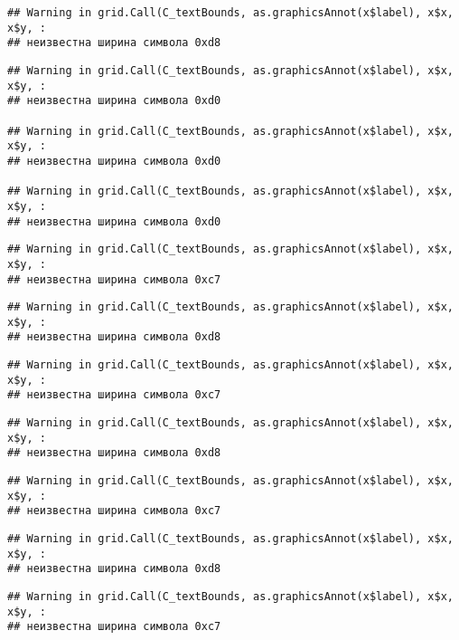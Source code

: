 \documentclass[
]{article}
\begin{document}
\begin{verbatim}
## Warning in grid.Call(C_textBounds, as.graphicsAnnot(x$label), x$x, x$y, :
## неизвестна ширина символа 0xd8
\end{verbatim}

\begin{verbatim}
## Warning in grid.Call(C_textBounds, as.graphicsAnnot(x$label), x$x, x$y, :
## неизвестна ширина символа 0xd0

## Warning in grid.Call(C_textBounds, as.graphicsAnnot(x$label), x$x, x$y, :
## неизвестна ширина символа 0xd0

## Warning in grid.Call(C_textBounds, as.graphicsAnnot(x$label), x$x, x$y, :
## неизвестна ширина символа 0xd0
\end{verbatim}

\begin{verbatim}
## Warning in grid.Call(C_textBounds, as.graphicsAnnot(x$label), x$x, x$y, :
## неизвестна ширина символа 0xc7
\end{verbatim}

\begin{verbatim}
## Warning in grid.Call(C_textBounds, as.graphicsAnnot(x$label), x$x, x$y, :
## неизвестна ширина символа 0xd8
\end{verbatim}

\begin{verbatim}
## Warning in grid.Call(C_textBounds, as.graphicsAnnot(x$label), x$x, x$y, :
## неизвестна ширина символа 0xc7
\end{verbatim}

\begin{verbatim}
## Warning in grid.Call(C_textBounds, as.graphicsAnnot(x$label), x$x, x$y, :
## неизвестна ширина символа 0xd8
\end{verbatim}

\begin{verbatim}
## Warning in grid.Call(C_textBounds, as.graphicsAnnot(x$label), x$x, x$y, :
## неизвестна ширина символа 0xc7
\end{verbatim}

\begin{verbatim}
## Warning in grid.Call(C_textBounds, as.graphicsAnnot(x$label), x$x, x$y, :
## неизвестна ширина символа 0xd8
\end{verbatim}

\begin{verbatim}
## Warning in grid.Call(C_textBounds, as.graphicsAnnot(x$label), x$x, x$y, :
## неизвестна ширина символа 0xc7
\end{verbatim}
\end{document}
